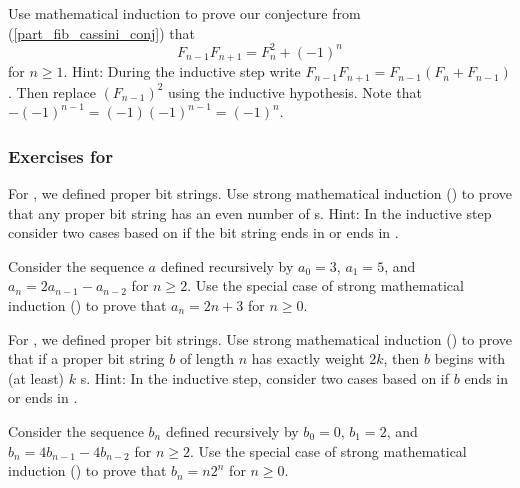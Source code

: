 \begin{exer}[\exerE] %
    Use mathematical induction to prove our conjecture from  (\ref{part_fib_cassini_conj}) that $$F_{n-1} F_{n+1} = F_n^2 + (-1)^n$$
    for $n \ge 1$.  Hint: During the inductive step write $F_{n-1} F_{n+1} = F_{n-1}\left(F_n+F_{n-1}\right)$. Then replace $(F_{n-1})^2$ using the inductive hypothesis.  Note that $-(-1)^{n-1}= (-1)(-1)^{n-1}=(-1)^n$.   
\end{exer}


\subsubsection*{Exercises for  \subpffstrongind}

\begin{exer}[\exerP] %
\label{exer_properbs_number0s}
    For , we defined proper bit strings.  Use strong mathematical induction () to prove that any proper bit string has an even number of s.  Hint: In the inductive step consider two cases based on if the bit string ends in  or ends in . 
\end{exer}

\begin{exer}[\exerP] %
\label{exer_math_ind_second_order_linear}
    Consider the sequence $a$ defined recursively by $a_0= 3$, $a_1 =5$, and $a_n =2a_{n-1} -a_{n-2}$ for $ n \ge 2$.   Use the special case of strong mathematical induction () to prove that $a_n = 2n+3$ for $n \ge 0$.   
\end{exer}

\begin{exer}[\exerU] %
\label{exer_properbs_starting0s}
    For , we defined proper bit strings.  Use strong mathematical induction () to prove that if a proper bit string $b$ of length $n$ has exactly weight $2k$, then $b$ begins with (at least) $k$ s. Hint: In the inductive step, consider two cases based on if  $b$ ends in  or ends in .
\end{exer}

\begin{exer}[\exerU] %
\label{exer_math_ind_second_order_powerof2} 
    Consider the sequence $b_n$ defined recursively by $b_0= 0$, $b_1 =2$, and $b_n =4b_{n-1} -4b_{n-2}$ for $ n \ge 2$.  Use the special case of strong mathematical induction () to prove that $b_n = n2^n$ for $n \ge 0$.
\end{exer}

